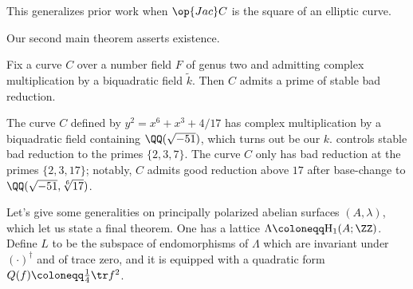 \documentclass{article}
\begin{document}
\begin{remark}
	This generalizes prior work when $\op{Jac}C$ is the square of an elliptic curve.
\end{remark}
Our second main theorem asserts existence.
\begin{theorem}
	Fix a curve $C$ over a number field $F$ of genus two and admitting complex multiplication by a biquadratic field $\widetilde k$. Then $C$ admits a prime of stable bad reduction.
\end{theorem}
\begin{example}
	The curve $C$ defined by $y^2=x^6+x^3+4/17$ has complex multiplication by a biquadratic field containing $\QQ(\sqrt{-51})$, which turns out be our $k$.  controls stable bad reduction to the primes $\{2,3,7\}$. The curve $C$ only has bad reduction at the primes $\{2,3,17\}$; notably, $C$ admits good reduction above $17$ after base-change to $\QQ(\sqrt{-51},\sqrt[6]{17})$.
\end{example}
Let's give some generalities on principally polarized abelian surfaces $(A,\lambda)$, which let us state a final theorem. One has a lattice $\Lambda\coloneqq\mathrm H_1(A;\ZZ)$. Define $L$ to be the subspace of endomorphisms of $\Lambda$ which are invariant under $(\cdot)^\dagger$ and of trace zero, and it is equipped with a quadratic form $Q(f)\coloneqq\frac14\tr f^2$.
\end{document}
